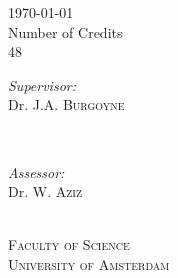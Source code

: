 \begin{titlepage}
\begin{fullwidth}
        {\Large \today}\\[1cm] %
        
        Number of Credits\\ %
        48\\[1cm]%
        
        \begin{minipage}[t]{0.4\textwidth}
        \begin{flushleft} \large
        \emph{Supervisor:} \\
        Dr. J.A. \textsc{Burgoyne}%
        \end{flushleft}
        \end{minipage}
        ~
        \begin{minipage}[t]{0.4\textwidth}
        \begin{flushright} \large
        \emph{Assessor:} \\
        Dr. W.  \textsc{Aziz}\\
        \end{flushright}
        \end{minipage}\\[2cm]
        
        
        \textsc{Faculty of Science}\\[1.0cm]
        \textsc{\large University of Amsterdam}\\[1.0cm] %
        
        
        \vfill %
    \end{fullwidth}
\end{titlepage}